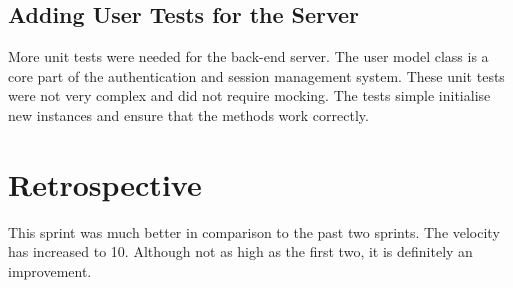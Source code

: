 \subsection{Adding User Tests for the Server}
More unit tests were needed for the back-end server. The user model class is a core part of the authentication and session management system. These unit tests were not very complex and did not require mocking. The tests simple initialise new instances and ensure that the methods work correctly.

\section{Retrospective}
This sprint was much better in comparison to the past two sprints. The velocity has increased to 10. Although not as high as the first two, it is definitely an improvement.
